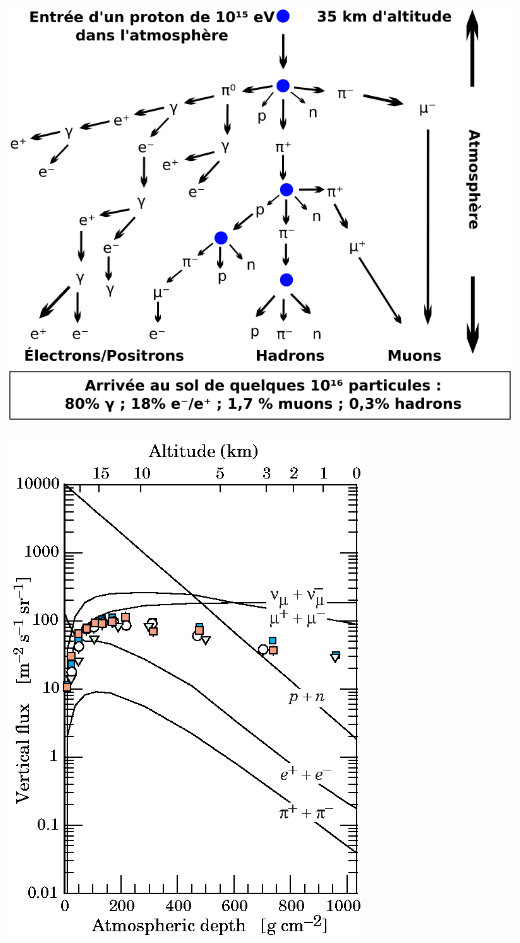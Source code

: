 \vspace{0.5cm}
\noindent
\begin{minipage}[t]{.44\textwidth}
\noindent
\centering
\includegraphics[width=1\textwidth]{GLA/Gerbe.png}
\captionsetup{type=figure}\caption{Schéma d'une cascade atmosphérique produite par un proton.}
\label{gerbe2}
\end{minipage}%
\hfill
\begin{minipage}[t]{.54\textwidth}
\noindent
\centering
\includegraphics[width=0.70\textwidth]{GLA/muon_rate.eps}
\captionsetup{type=figure}\caption{Composition du flux cosmique dans l'atmosphère terrestre pour des particules ayant une énergie supérieure à \SI{1}{\giga\eV}. Les points colorés représentent les mesures de flux de muons négatifs réalisées par plusieurs expériences \cite{Olive:2016xmw}.}
\label{flux}
\end{minipage}

